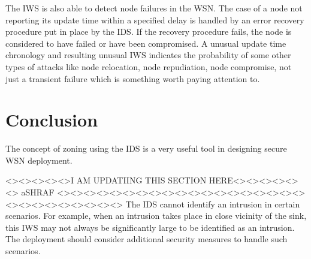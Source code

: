 \documentclass[conference,final]{IEEEtran}
\newcommand{\notedme}[1]{\raisebox{0pt}[0pt][0pt]{\pdfcomment[open=true,color=blue]{#1}}}
\begin{document}
The IWS is also able to detect node failures in the WSN.
The case of a node not reporting its update time within a specified delay is handled by an error recovery procedure put in place by the IDS.
If the recovery procedure fails, the node is considered to have failed or have been compromised.
A unusual update time chronology and resulting unusual IWS  indicates the probability of some other types of attacks like node relocation, node repudiation, node compromise, not just a transient failure which is something worth paying attention to.

\section{Conclusion}
\label{sec:concl}

The concept of zoning using the IDS is a very useful tool in designing secure WSN deployment.

<><><><><>I AM UPDATIING THIS SECTION HERE<><><><><><> aSHRAF
<><><><><><><><><><><><><><><><><><><><><><><><><><><><>
The IDS cannot identify an intrusion in certain scenarios.
For example, when an intrusion takes place in close vicinity of the sink, this IWS may not always be significantly large to be identified as an intrusion. 
The deployment should consider additional security measures to handle such scenarios.
\end{document}
